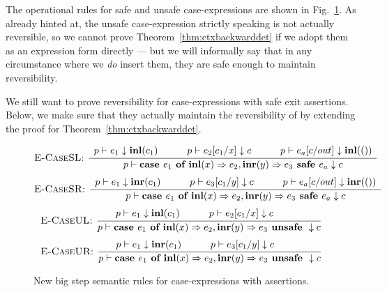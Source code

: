 The operational rules for safe and unsafe case-expressions are shown in
Fig.~\ref{math:assertion_semantics}. As already hinted at, the unsafe
case-expression strictly speaking is not actually reversible, so we cannot
prove Theorem~\ref{thm:ctxbackwarddet} if we adopt them as an expression form
directly --- but we will informally say that in any circumstance where we
\emph{do} insert them, they are safe enough to maintain reversibility.

We still want to prove reversibility for case-expressions with safe exit
assertions.  Below, we make sure that they actually maintain the reversibility
of \rfunc by extending the proof for Theorem~\ref{thm:ctxbackwarddet}.

\begin{figure}[ht]
\begin{align*}
  \textsc{E-CaseSL: }
    \dfrac
      {\begin{array}{cccccc}
       p \vdash e_1 \downarrow \textbf{inl}(c_1) & \quad &
       p \vdash e_2 [c_1 / x] \downarrow c & \quad &
       p \vdash e_a [c / out] \downarrow \textbf{inl}(())
       \end{array}}
      {p \vdash \textbf{case } e_1 \textbf{ of } \textbf{inl}(x) \Rightarrow e_2, \textbf{inr}(y) \Rightarrow e_3 \textbf{ safe } e_a \downarrow c}
\end{align*}
\alignspace
\begin{align*}
  \textsc{E-CaseSR: }
    \dfrac
      {\begin{array}{cccccc}
       p \vdash e_1 \downarrow \textbf{inr}(c_1) & \quad &
       p \vdash e_3 [c_1 / y] \downarrow c & \quad &
       p \vdash e_a [c / out] \downarrow \textbf{inr}(())
       \end{array}}
      {p \vdash \textbf{case } e_1 \textbf{ of } \textbf{inl}(x) \Rightarrow e_2, \textbf{inr}(y) \Rightarrow e_3 \textbf{ safe } e_a \downarrow c}
\end{align*}
\alignspace
\begin{align*}
  \textsc{E-CaseUL: }
    \dfrac
      {\begin{array}{ccccc}
       p \vdash e_1 \downarrow \textbf{inl}(c_1) & \quad &
       p \vdash e_2 [c_1 / x] \downarrow c & \quad &
       \end{array}}
      {p \vdash \textbf{case } e_1 \textbf{ of } \textbf{inl}(x) \Rightarrow e_2, \textbf{inr}(y) \Rightarrow e_3 \textbf{ unsafe } \downarrow c}
\end{align*}
\alignspace
\begin{align*}
  \textsc{E-CaseUR: }
    \dfrac
      {\begin{array}{ccccc}
       p \vdash e_1 \downarrow \textbf{inr}(c_1) & \quad &
       p \vdash e_3 [c_1 / y] \downarrow c & \quad &
       \end{array}}
      {p \vdash \textbf{case } e_1 \textbf{ of } \textbf{inl}(x) \Rightarrow e_2, \textbf{inr}(y) \Rightarrow e_3 \textbf{ unsafe } \downarrow c}
\end{align*}
\caption{New big step semantic rules for case-expressions with
assertions.}\label{math:assertion_semantics}
\end{figure}

